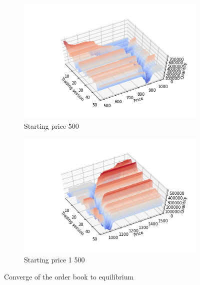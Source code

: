 \begin{figure}
    \centering
    \begin{subfigure}{.5\textwidth}
      \centering
      \includegraphics[width=\linewidth]{plots/basic_market_depth_converge_lower.png}
      \caption{Starting price 500}
      \label{fig:market_depth_lower}
    \end{subfigure}%
    \begin{subfigure}{.5\textwidth}
      \centering
      \includegraphics[width=\linewidth]{plots/basic_market_depth_converge_higher.png}
      \caption{Starting price 1 500}
      \label{fig:market_depth_higher}
    \end{subfigure}
    \caption{Converge of the order book to equilibrium}
    \label{fig:market_depths}
\end{figure}

